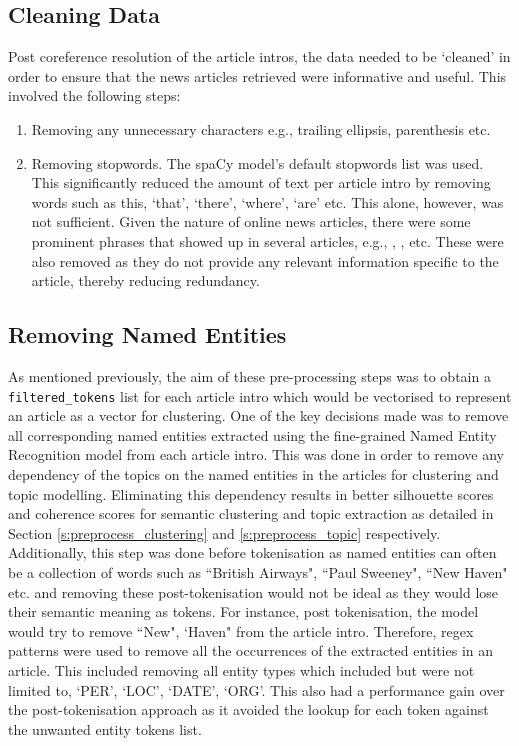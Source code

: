 \subsection{Cleaning Data} \label{data_cleaning}
Post coreference resolution of the article intros, the data needed to be `cleaned' in order to ensure that the news articles retrieved were informative and useful. This involved the following steps: 
\begin{enumerate}
    \item Removing any unnecessary characters e.g., trailing ellipsis, parenthesis etc.
    \item Removing stopwords. The spaCy model's default stopwords list was used. This significantly reduced the amount of text per article intro by removing words such as this, `that', `there', `where', `are' etc. This alone, however, was not sufficient. Given the nature of online news articles, there were some prominent phrases that showed up in several articles, e.g., , ,  etc. These were also removed as they do not provide any relevant information specific to the article, thereby reducing redundancy.

\end{enumerate}

\subsection{Removing Named Entities}
As mentioned previously, the aim of these pre-processing steps was to obtain a \texttt{filtered\_tokens} list for each article intro which would be vectorised to represent an article as a vector for clustering. 
One of the key decisions made was to remove all corresponding named entities extracted using the fine-grained Named Entity Recognition model from each article intro. This was done in order to remove any dependency of the topics on the named entities in the articles for clustering and topic modelling. Eliminating this dependency results in better silhouette scores and coherence scores for semantic clustering and topic extraction as detailed in Section \ref{s:preprocess_clustering} and \ref{s:preprocess_topic} respectively. Additionally, this step was done before tokenisation as named entities can often be a collection of words such as ``British Airways", ``Paul Sweeney", ``New Haven" etc. and removing these post-tokenisation would not be ideal as they would lose their semantic meaning as tokens. For instance, post tokenisation, the model would try to remove ``New", `Haven" from the article intro. Therefore, regex patterns were used to remove all the occurrences of the extracted entities in an article. This included removing all entity types which included but were not limited to, `PER', `LOC', `DATE', `ORG'. This also had a performance gain over the post-tokenisation approach as it avoided the lookup for each token against the unwanted entity tokens list.

